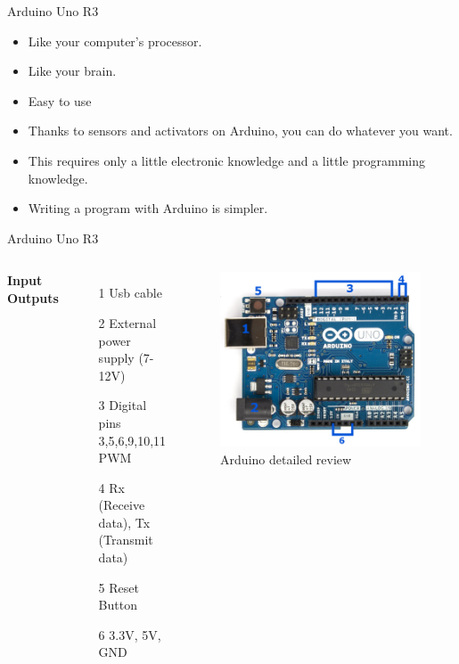 \documentclass[xcolor=table, 9pt]{beamer}
\begin{document}


\begin{frame}{Arduino Uno R3}
\begin{itemize}
\item Like your computer's processor.
\item Like your brain.
\item Easy to use
\item Thanks to sensors and activators on Arduino, you can do whatever you want.
\item This requires only a little electronic knowledge and a little programming knowledge.
\item Writing a program with Arduino is simpler.
\end{itemize}
\end{frame}




\begin{frame}{Arduino Uno R3}
\begin{columns}[c] 
\textbf{Input Outputs}\\~\\
\begin{itemize}
\item[1]Usb cable
\item[2]External power supply (7-12V)
\item[3]Digital pins 3,5,6,9,10,11 PWM
\item[4]Rx (Receive data), Tx (Transmit data)
\item[5]Reset Button 
\item[6]3.3V, 5V, GND 
\end{itemize}
\begin{figure}
\includegraphics[width=1\linewidth]{arduinoreview.png}
\caption{Arduino detailed review}
\end{figure}
\end{columns}
\end{frame}
\end{document}
